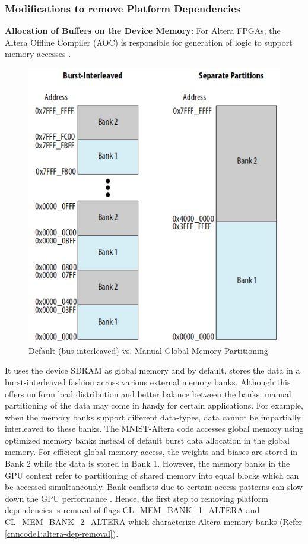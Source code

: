\subsubsection{Modifications to remove Platform Dependencies}
\label{3_1_3_3}
\textbf{Allocation of Buffers on the Device Memory:}\newline
For Altera FPGAs, the Altera Offline Compiler (AOC) is responsible for generation of logic to support memory accesses \cite{alteraopencl}. 
\begin{figure}[h!]
 \centering
 \includegraphics[width=0.5\linewidth]{figures/global_mem_partitions.png}
 \caption{Default (bus-interleaved) vs. Manual Global Memory Partitioning
 \cite{alteraopencl}}
 \label{fig:global_mem_partitions}
\end{figure}
It uses the device SDRAM as global memory and by default, stores the data in a burst-interleaved fashion across various external memory banks. Although this offers uniform load distribution and better balance between the banks, manual partitioning of the data may come in handy for certain applications. For example, when the memory banks support different data-types, data cannot be impartially interleaved to these banks. \newline \newline
The MNIST-Altera code \cite{mnist-altera-opencl} accesses global memory using optimized memory banks instead of default burst data allocation in the global memory. 
For efficient global memory access, the weights and biases are stored in Bank 2 while the data is stored in Bank 1. However, the memory banks in the GPU context refer to partitioning of shared memory into equal blocks which can be accessed simultaneously. Bank conflicts due to certain access patterns can slow down the GPU performance \cite{gpu_mem_bank}. Hence, the first step to removing platform dependencies is removal of flags CL\_MEM\_BANK\_1\_ALTERA and CL\_MEM\_BANK\_2\_ALTERA which characterize Altera memory banks (Refer \ref{cnncode1:altera-dep-removal}).\newline \newline
